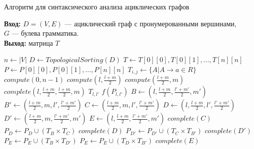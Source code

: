 \documentclass{spbau-diploma}
\begin{document}
\begin{algorithm}
\caption{Алгоритм для синтаксического анализа ациклических графов}\label{DAGalg}
 \hspace*{\algorithmicindent} \textbf{Вход:} $D = (V, E)$ --- ациклический граф с пронумерованными вершинами, \\$G$ ---  булева грамматика.\\
 \hspace*{\algorithmicindent} \textbf{Выход:} матрица $T$
\begin{algorithmic}[1]
\State $n \gets  |V|$
\State $D \gets TopologicalSorting(D)$
\State $T \gets T[0][0], T[0][1], ... , T[n] [n]$
\State $P \gets P[0][0], P[0][1], ... , P[n] [n]$
\State $T_{i,j} \gets \{A|A \to a \in R\}$
 \EndFor
\State $compute(0, n-1)$
\State $compute(l, \frac{l+m}{2})$
\State $compute(\frac{l+m}{2},m)$
\EndIf
\State $complete(l, \frac{l+m}{2}, \frac{l+m}{2}, m)$
\EndProcedure
{}
\State $T_{l,l'}$ \gets $f(P_{l,l'})$
\State $B \gets (l, \frac{l+m}{2}, \frac{l'+m'}{2}, m')$
\State $B' \gets (\frac{l+m}{2}, m, l', \frac{l'+m'}{2})$
\State $C \gets (\frac{l+m}{2}, m, l', \frac{l'+m'}{2})$
\State $D \gets (l, \frac{l+m}{2}, l', \frac{l'+m'}{2})$
\State $D' \gets (\frac{l+m}{2}, m, \frac{l'+m'}{2}, m')$
\State $E \gets (l, \frac{l+m}{2}, \frac{l'+m'}{2}, m')$
\State $complete(C)$
\State $P_D \gets P_D \cup (T_B \times T_C)$
\State $complete(D)$
\State $P_{D'} \gets P_{D'} \cup (T_C \times T_{B'})$
\State $complete(D')$
\State $P_{E} \gets P_{E} \cup (T_B \times T_{D'})$
\State $P_{E} \gets P_{E} \cup (T_D \times T_{B'})$
\State $complete(E)$
\EndIf

\EndProcedure

\end{algorithmic}
\end{algorithm}
\end{document}
